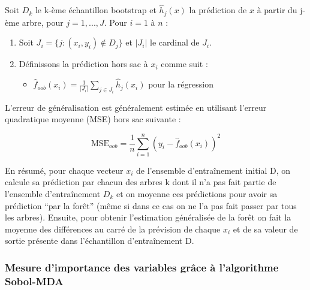 \documentclass[
]{article}
\providecommand{\tightlist}{%
  \setlength{\itemsep}{0pt}\setlength{\parskip}{0pt}}
\begin{document}
Soit \(D_k\) le k-ème échantillon bootstrap et \(\hat{h}_j(x)\) la
prédiction de \(x\) à partir du j-ème arbre, pour \(j = 1, . . . , J\).
Pour \(i = 1\) à \(n\) :

\begin{enumerate}
\def\labelenumi{\arabic{enumi}.}
\item
  Soit \(J_i = \{ j : (x_i, y_i) \notin D_j\}\) et \(|J_i|\) le cardinal
  de \(J_i\).
\item
  Définissons la prédiction hors sac à \(x_i\) comme suit :

  \begin{itemize}
  \tightlist
  \item
    \(\hat{f}_{oob}(x_i) = \frac{1}{|J_i|} \sum_{j \in J_i} \hat{h}_j(x_i)\)
    pour la régression
  \end{itemize}
\end{enumerate}

L'erreur de généralisation est généralement estimée en utilisant
l'erreur quadratique moyenne (MSE) hors sac suivante :

\[
\text{MSE}_{oob} = \frac{1}{n} \sum_{i=1}^{n} (y_i - \hat{f}_{oob}(x_i))^2
\]

En résumé, pour chaque vecteur \(x_i\) de l'ensemble d'entraînement
initial D, on calcule sa prédiction par chacun des arbres k dont il n'a
pas fait partie de l'ensemble d'entraînement \(D_k\) et on moyenne ces
prédictions pour avoir sa prédiction ``par la forêt'' (même si dans ce
cas on ne l'a pas fait passer par tous les arbres). Ensuite, pour
obtenir l'estimation généralisée de la forêt on fait la moyenne des
différences au carré de la prévision de chaque \(x_i\) et de sa valeur
de sortie présente dans l'échantillon d'entraînement D.

\hypertarget{mesure-dimportance-des-variables-gruxe2ce-uxe0-lalgorithme-sobol-mda}{%
\subsubsection{Mesure d'importance des variables grâce à l'algorithme
Sobol-MDA}\label{mesure-dimportance-des-variables-gruxe2ce-uxe0-lalgorithme-sobol-mda}}
\end{document}
